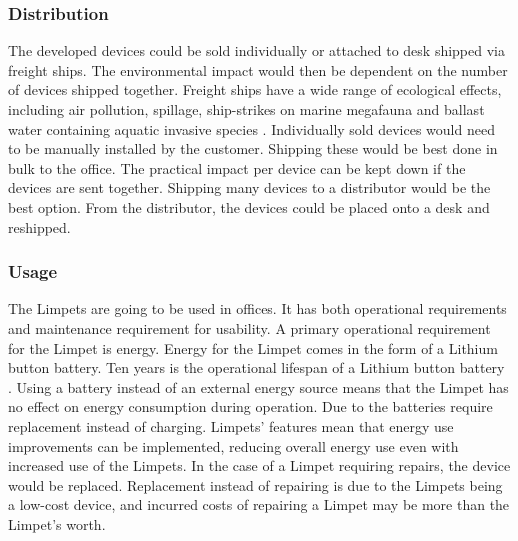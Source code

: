 \subsubsection*{Distribution}
The developed devices could be sold individually or attached to desk shipped via freight
ships. The environmental impact would then be dependent on the number of devices
shipped together. Freight ships have a wide range of ecological effects, including air
pollution, spillage, ship-strikes on marine megafauna and ballast water containing aquatic
invasive species \cite{sus_dis}.
Individually sold devices would need to be manually installed by the customer. Shipping
these would be best done in bulk to the office. The practical impact per device can be kept
down if the devices are sent together. Shipping many devices to a distributor would be the
best option. From the distributor, the devices could be placed onto a desk and reshipped.

\subsubsection*{Usage}
The Limpets are going to be used in offices. It has both operational requirements and
maintenance requirement for usability.
A primary operational requirement for the Limpet is energy. Energy for the Limpet comes in
the form of a Lithium button battery. Ten years is the operational lifespan of a Lithium
button battery \cite{sus_usg}. Using a battery instead of an external energy source means that the
Limpet has no effect on energy consumption during operation. Due to the batteries require
replacement instead of charging. Limpets’ features mean that energy use improvements can
be implemented, reducing overall energy use even with increased use of the Limpets.
In the case of a Limpet requiring repairs, the device would be replaced. Replacement
instead of repairing is due to the Limpets being a low-cost device, and incurred costs of
repairing a Limpet may be more than the Limpet’s worth.

